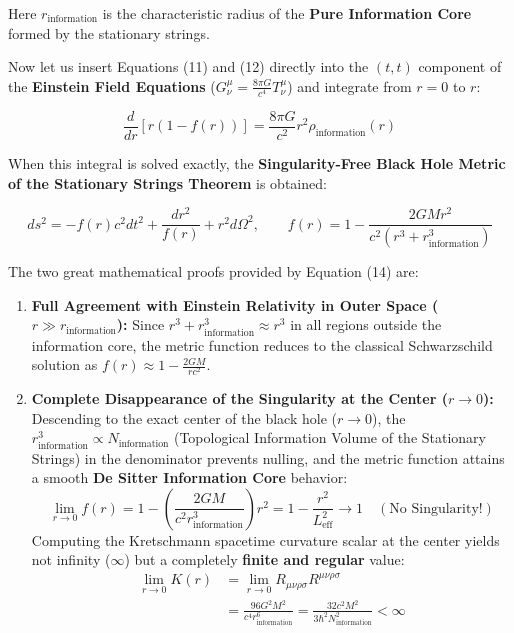 \documentclass[12pt,a4paper]{article}
\begin{document}
Here $r_{\text{information}}$ is the characteristic radius of the \textbf{Pure Information Core} formed by the stationary strings.

Now let us insert Equations (11) and (12) directly into the $(t,t)$ component of the \textbf{Einstein Field Equations} ($G^\mu_\nu = \frac{8\pi G}{c^4} T^\mu_\nu$) and integrate from $r=0$ to $r$:

\begin{equation}
\frac{d}{dr} \left[ r \left( 1 - f(r) \right) \right] = \frac{8\pi G}{c^2} r^2 \rho_{\text{information}}(r)
\end{equation}

When this integral is solved exactly, the \textbf{Singularity-Free Black Hole Metric of the Stationary Strings Theorem} is obtained:

\begin{equation}
ds^2 = -f(r) c^2 dt^2 + \frac{dr^2}{f(r)} + r^2 d\Omega^2, \qquad f(r) = 1 - \frac{2GM r^2}{c^2 \left( r^3 + r_{\text{information}}^3 \right)}
\end{equation}

The two great mathematical proofs provided by Equation (14) are:

\begin{enumerate}
    \item \textbf{Full Agreement with Einstein Relativity in Outer Space ($r \gg r_{\text{information}}$):} Since $r^3 + r_{\text{information}}^3 \approx r^3$ in all regions outside the information core, the metric function reduces to the classical Schwarzschild solution as $f(r) \approx 1 - \frac{2GM}{rc^2}$.
    \item \textbf{Complete Disappearance of the Singularity at the Center ($r \to 0$):} Descending to the exact center of the black hole ($r \to 0$), the $r_{\text{information}}^3 \propto N_{\text{information}}$ (Topological Information Volume of the Stationary Strings) in the denominator prevents nulling, and the metric function attains a smooth \textbf{De Sitter Information Core} behavior:
    \begin{equation}
    \lim_{r \to 0} f(r) = 1 - \left( \frac{2GM}{c^2 r_{\text{information}}^3} \right) r^2 = 1 - \frac{r^2}{L_{\text{eff}}^2} \longrightarrow 1 \quad (\text{No Singularity!})
    \end{equation}
    Computing the Kretschmann spacetime curvature scalar at the center yields not infinity ($\infty$) but a completely \textbf{finite and regular} value:
    \begin{equation}
    \begin{split}
    \lim_{r \to 0} K(r) &= \lim_{r \to 0} R_{\mu\nu\rho\sigma}R^{\mu\nu\rho\sigma} \\
    &= \frac{96 G^2 M^2}{c^4 r_{\text{information}}^6} = \frac{32 c^2 M^2}{3 \hbar^2 N_{\text{information}}^2} < \infty
    \end{split}
    \end{equation}
\end{enumerate}
\end{document}
